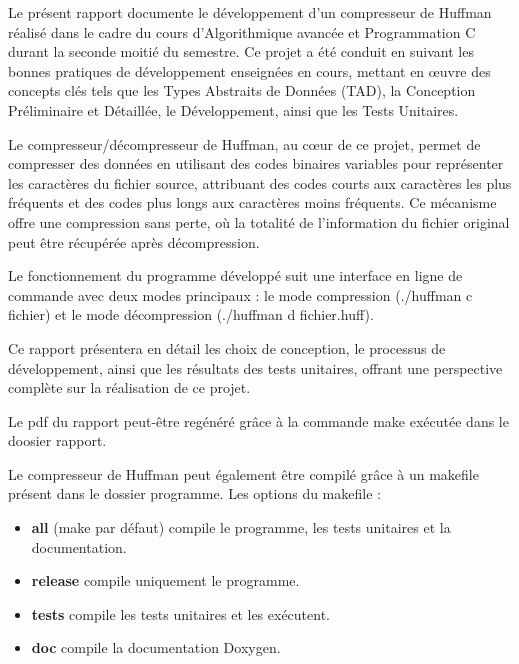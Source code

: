 Le présent rapport documente le développement d'un compresseur de Huffman réalisé dans le cadre du cours d'Algorithmique avancée et Programmation C durant la seconde moitié du semestre. Ce projet a été conduit en suivant les bonnes pratiques de développement enseignées en cours, mettant en œuvre des concepts clés tels que les Types Abstraits de Données (TAD), la Conception Préliminaire et Détaillée, le Développement, ainsi que les Tests Unitaires.

Le compresseur/décompresseur de Huffman, au cœur de ce projet, permet de compresser des données en utilisant des codes binaires variables pour représenter les caractères du fichier source, attribuant des codes courts aux caractères les plus fréquents et des codes plus longs aux caractères moins fréquents. Ce mécanisme offre une compression sans perte, où la totalité de l'information du fichier original peut être récupérée après décompression.

Le fonctionnement du programme développé suit une interface en ligne de commande avec deux modes principaux : le mode compression (./huffman c fichier) et le mode décompression (./huffman d fichier.huff).

Ce rapport présentera en détail les choix de conception, le processus de développement, ainsi que les résultats des tests unitaires, offrant une perspective complète sur la réalisation de ce projet.

Le pdf du rapport peut-être regénéré grâce à la commande make exécutée dans le doosier rapport.

Le compresseur de Huffman peut également être compilé grâce à un makefile présent dans le dossier programme.
Les options du makefile :
\begin{itemize}
	\item \textbf{all} (make par défaut) compile le programme, les tests unitaires et la documentation.
    \item \textbf{release} compile uniquement le programme.
	\item \textbf{tests} compile les tests unitaires et les exécutent.
	\item \textbf{doc} compile la documentation Doxygen.
\end{itemize}